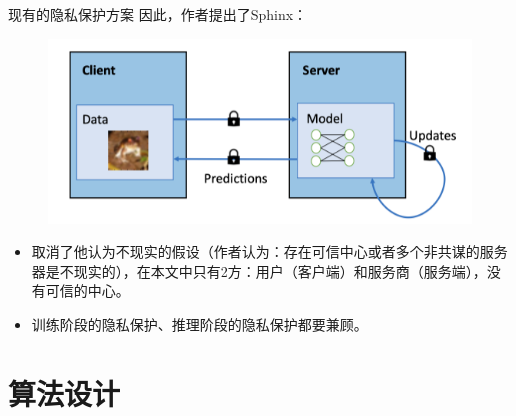 \documentclass{beamer}
\begin{document}
\begin{frame}{现有的隐私保护方案}
	因此，作者提出了Sphinx：
	\begin{figure}[h]
    	\centering
        \includegraphics[height=.4\textheight]{pic/online-learning.png}
    \end{figure} 
	\begin{itemize}
        \item {\footnotesize 取消了他认为不现实的假设（作者认为：存在可信中心或者多个非共谋的服务器是不现实的），在本文中只有2方：用户（客户端）和服务商（服务端），没有可信的中心。}
        \item {\footnotesize 训练阶段的隐私保护、推理阶段的隐私保护都要兼顾。}
    	\end{itemize}
\end{frame}
\section{算法设计}

\end{document}
